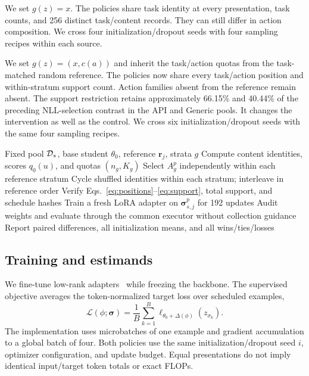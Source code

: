 We set $g(z)=x$. The policies share task identity at every presentation, task counts, and 256 distinct task/content records. They can still differ in action composition. We cross four initialization/dropout seeds with four sampling recipes within each source.

We set $g(z)=(x,c(a))$ and inherit the task/action quotas from the task-matched random reference. The policies now share every task/action position and within-stratum support count. Action families absent from the reference remain absent. The support restriction retains approximately 66.15\% and 40.44\% of the preceding NLL-selection contrast in the API and Generic pools. It changes the intervention as well as the control. We cross six initialization/dropout seeds with the same four sampling recipes.

\begin{algorithm}[t]
\caption{Matched content selection and paired evaluation}
\label{alg:protocol}
\begin{algorithmic}[1]
\Require Fixed pool $\mathcal{D}_s$, base student $\theta_0$, reference $\mathbf r_j$, strata $g$
\State Compute content identities, scores $q_0(u)$, and quotas $(n_g,K_g)$
  \State Select $A_g^p$ independently within each reference stratum
  \State Cycle shuffled identities within each stratum; interleave in reference order
  \State Verify Eqs.~\eqref{eq:positions}--\eqref{eq:support}, total support, and schedule hashes
    \State Train a fresh LoRA adapter on $\boldsymbol\sigma^p_{s,j}$ for 192 updates
    \State Audit weights and evaluate through the common executor without collection guidance
  \EndFor
\EndFor
\State Report paired differences, all initialization means, and all wins/ties/losses
\end{algorithmic}
\end{algorithm}

\subsection{Training and estimands}
We fine-tune low-rank adapters~\citep{hu2022lora} while freezing the backbone. The supervised objective averages the token-normalized target loss over scheduled examples,
\begin{equation}
 \mathcal L(\phi;\boldsymbol\sigma)
 =\frac1B\sum_{k=1}^{B}\ell_{\theta_0+\Delta(\phi)}(z_{\sigma_k}).
 \label{eq:sft}
\end{equation}
The implementation uses microbatches of one example and gradient accumulation to a global batch of four. Both policies use the same initialization/dropout seed $i$, optimizer configuration, and update budget. Equal presentations do not imply identical input/target token totals or exact FLOPs.

